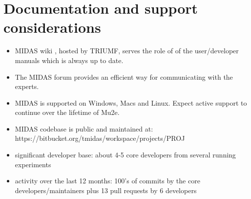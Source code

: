 \section{Documentation and support considerations}

\begin{itemize}
\item
  MIDAS wiki \cite{2025_MIDAS_WIKI}, hosted by TRIUMF, serves the role of 
  of the user/developer manuals which is always up to date.
\item 
  The MIDAS forum provides an efficient way for communicating with the experts.
\item
  MIDAS is supported on Windows, Macs and Linux.
  Expect active support to continue over the lifetime of Mu2e.
\item 
  MIDAS codebase is public and maintained at: https://bitbucket.org/tmidas/workspace/projects/PROJ
\item
  significant developer base: about 4-5 core developers from several running experiments
\item
  activity over the last 12 months: 100's of commits by the core developers/maintainers plus
  13 pull requests by 6 developers
\end{itemize}




